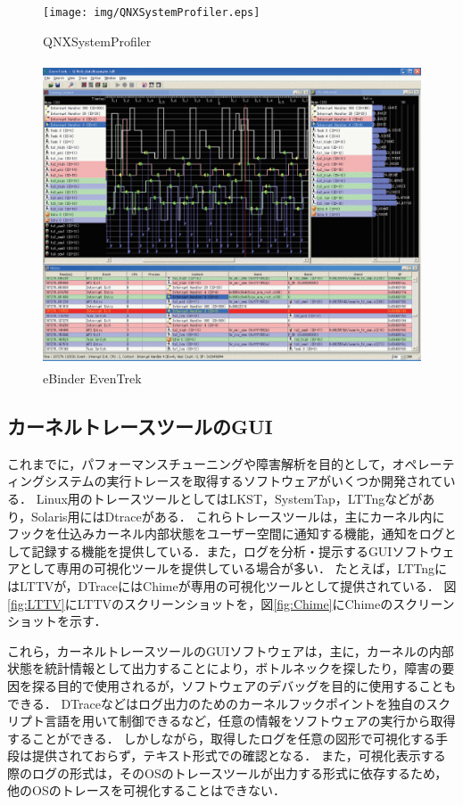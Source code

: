 \begin{figure}[p]
\begin{center}
\texttt{[image: img/QNXSystemProfiler.eps]}
\caption{QNXSystemProfiler}
\label{fig:QNXSystemProfiler}
\end{center}
\end{figure}

\begin{figure}[p]
\begin{center}
\includegraphics[height=9cm]{img/EvenTrek.eps}
\caption{eBinder EvenTrek}
\label{fig:EvenTrek}
\end{center}
\end{figure}

\subsection{カーネルトレースツールのGUI}

これまでに，パフォーマンスチューニングや障害解析を目的として，オペレーティングシステムの実行トレースを取得するソフトウェアがいくつか開発されている．
Linux用のトレースツールとしてはLKST\cite{LKST}，SystemTap\cite{SystemTap}，LTTng\cite{LTTng}などがあり，Solaris用にはDtrace\cite{Dtrace}がある．
これらトレースツールは，主にカーネル内にフックを仕込みカーネル内部状態をユーザー空間に通知する機能，通知をログとして記録する機能を提供している．また，ログを分析・提示するGUIソフトウェアとして専用の可視化ツールを提供している場合が多い．
たとえば，LTTngにはLTTV\cite{LTTV}が，DTraceにはChime\cite{Chime}が専用の可視化ツールとして提供されている．
図\ref{fig:LTTV}にLTTVのスクリーンショットを，図\ref{fig:Chime}にChimeのスクリーンショットを示す．

これら，カーネルトレースツールのGUIソフトウェアは，主に，カーネルの内部状態を統計情報として出力することにより，ボトルネックを探したり，障害の要因を探る目的で使用されるが，ソフトウェアのデバッグを目的に使用することもできる．
DTraceなどはログ出力のためのカーネルフックポイントを独自のスクリプト言語を用いて制御できるなど，任意の情報をソフトウェアの実行から取得することができる．
しかしながら，取得したログを任意の図形で可視化する手段は提供されておらず，テキスト形式での確認となる．
また，可視化表示する際のログの形式は，そのOSのトレースツールが出力する形式に依存するため，他のOSのトレースを可視化することはできない．

